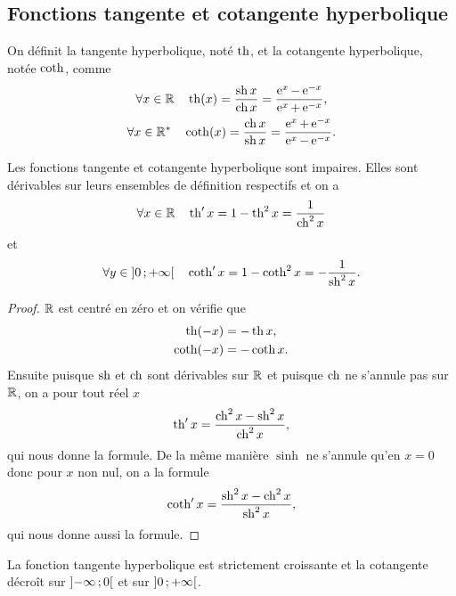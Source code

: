 \subsection{Fonctions tangente et cotangente hyperbolique}
\label{subsec:chap1-tanhetcotanh}
\begin{defdef}
  On définit la tangente hyperbolique, noté $\operatorname{th}$, et la cotangente hyperbolique, notée $\operatorname{coth}$, comme
  \begin{gather}
    \forall x \in \mathbb{R} \quad \operatorname{th}(x)=\frac{\operatorname{sh} x}{\operatorname{ch} x}=\frac{\operatorname{e}^x - \operatorname{e}^{-x}}{\operatorname{e}^x+\operatorname{e}^{-x}}, \\
    \forall x \in \mathbb{R}^* \quad \operatorname{coth}(x)=\frac{\operatorname{ch} x}{\operatorname{sh} x}=\frac{\operatorname{e}^x + \operatorname{e}^{-x}}{\operatorname{e}^x-\operatorname{e}^{-x}}.
  \end{gather}
\end{defdef}
%
\begin{prop}
  Les fonctions tangente et cotangente hyperbolique sont impaires. Elles sont dérivables sur leurs ensembles de définition respectifs et on a
  \begin{equation}
    \forall x \in \mathbb{R} \quad \operatorname{th}' x = 1-\operatorname{th}^2 x = \frac{1}{\operatorname{ch}^2 x}
  \end{equation}
  et
  \begin{equation}
    \forall y \in \left] 0 \, ;  +\infty \right[ \quad \operatorname{coth}' x=1-\operatorname{coth}^2 x=-\frac{1}{\operatorname{sh}^2 x}.
  \end{equation}
\end{prop}
\begin{proof}
  $\mathbb{R}$ est centré en zéro et on vérifie que
  \begin{gather}
    \operatorname{th}(-x)=-\operatorname{th} x, \\
    \operatorname{coth}(-x) = -\operatorname{coth} x.
  \end{gather}
  Ensuite puisque $\operatorname{sh}$ et $\operatorname{ch}$ sont dérivables sur $\mathbb{R}$ et puisque $\operatorname{ch}$ ne s'annule pas sur $\mathbb{R}$, on a pour tout réel $x$
  \begin{equation}
    \operatorname{th}' x = \frac{\operatorname{ch}^2 x - \operatorname{sh}^2 x}{\operatorname{ch}^2 x},
  \end{equation}
  qui nous donne la formule. De la même manière $\sinh$ ne s'annule qu'en $x=0$ donc pour $x$ non nul, on a la formule
  \begin{equation}
    \operatorname{coth}' x = \frac{\operatorname{sh}^2 x - \operatorname{ch}^2 x}{\operatorname{sh}^2 x},
  \end{equation}
  qui nous donne aussi la formule.
\end{proof}
La fonction tangente hyperbolique est strictement croissante et la cotangente décroît sur $\left] -\infty \, ;  0 \right[$ et sur $\left] 0 \, ;  +\infty \right[$.
%
